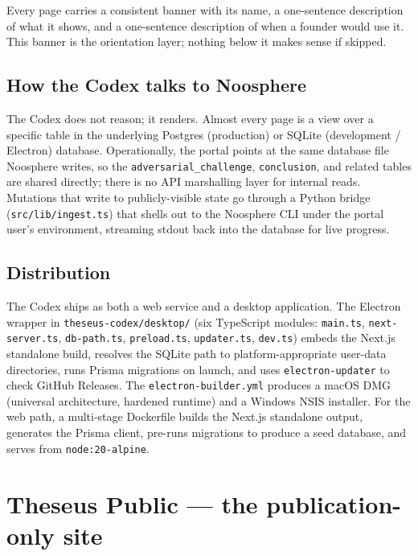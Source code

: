 \documentclass[11pt,letterpaper]{article}
\newcommand{\file}[1]{\texttt{#1}}
\begin{document}
Every page carries a consistent banner with its name, a one-sentence description of what it shows, and a one-sentence description of when a founder would use it. This banner is the orientation layer; nothing below it makes sense if skipped.

\subsection{How the Codex talks to Noosphere}

The Codex does not reason; it renders. Almost every page is a view over a specific table in the underlying Postgres (production) or SQLite (development / Electron) database. Operationally, the portal points at the same database file Noosphere writes, so the \texttt{adversarial\_challenge}, \texttt{conclusion}, and related tables are shared directly; there is no API marshalling layer for internal reads. Mutations that write to publicly-visible state go through a Python bridge (\file{src/lib/ingest.ts}) that shells out to the Noosphere CLI under the portal user's environment, streaming stdout back into the database for live progress.

\subsection{Distribution}

The Codex ships as both a web service and a desktop application. The Electron wrapper in \file{theseus-codex/desktop/} (six TypeScript modules: \file{main.ts}, \file{next-server.ts}, \file{db-path.ts}, \file{preload.ts}, \file{updater.ts}, \file{dev.ts}) embeds the Next.js standalone build, resolves the SQLite path to platform-appropriate user-data directories, runs Prisma migrations on launch, and uses \texttt{electron-updater} to check GitHub Releases. The \file{electron-builder.yml} produces a macOS DMG (universal architecture, hardened runtime) and a Windows NSIS installer. For the web path, a multi-stage Dockerfile builds the Next.js standalone output, generates the Prisma client, pre-runs migrations to produce a seed database, and serves from \texttt{node:20-alpine}.

\section{Theseus Public --- the publication-only site}
\end{document}

